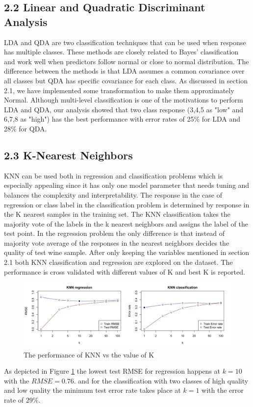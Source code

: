 \documentclass{article}
\begin{document}
\subsection{2.2  Linear and Quadratic Discriminant Analysis}
LDA and QDA are two classification techniques that can be used when response has multiple classes. These methods are closely related to Bayes' classification and work well when predictors follow normal or close to normal distribution. The difference between the methods is that LDA assumes a common covariance over all classes but QDA has specific covariance for each class. As discussed in section 2.1, we have implemented some transformation to make them approximately Normal. Although multi-level classification is one of the motivations to perform LDA and QDA, our analysis showed that two class response (3,4,5 as "low" and 6,7,8 as "high") has the best performance with error rates of 25\% for LDA and 28\% for QDA. 



\subsection{2.3  K-Nearest Neighbors}\label{knn_body}
KNN can be used both in regression and classification problems which is especially appealing since it has only one model parameter that needs tuning and balances the complexity and interpretability. The response in the case of regression or class label in the classification problem is determined by response in the K nearest samples in the training set. The KNN classification takes the majority vote of the labels in the k nearest neighbors and assigns the label of the test point. In the regression problem the only difference is that instead of majority vote average of the responses in the nearest neighbors decides the quality of test wine sample.
After only keeping the variables mentioned in section 2.1 both KNN classification and regression are explored on the dataset. The performance is cross validated with different values of K and best K is reported. 
\begin{figure}[H]
    \centering
    \includegraphics[scale=0.2]{knn.png}
    \caption{The performance of KNN  vs the value of K}
    \label{knn}
    
\end{figure}
As depicted in Figure \ref{knn} the lowest test RMSE for regression happens at $k=10$ with the $RMSE = 0.76$. and for the classification with two classes of high quality and low quality the minimum test error rate takes place at $k=1$ with the error rate of $29\%$.
\end{document}
